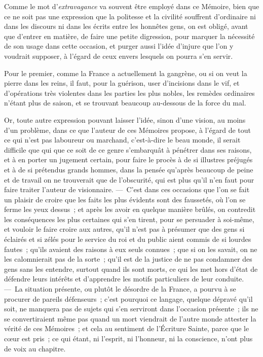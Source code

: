 \documentclass[french,twoside]{book} %
\begin{document}
Comme le mot d’{\itshape extravagance} va souvent être employé dans ce Mémoire, bien que ce ne soit pas une expression que la politesse et la civilité souffrent d’ordinaire ni dans les discours ni dans les écrits entre les honnêtes gens, on est obligé, avant que d’entrer en matière, de faire une petite digression, pour marquer la nécessité de son usage dans cette occasion, et purger aussi l’idée d’injure que l’on y voudrait supposer, à l’égard de ceux envers lesquels on pourra s’en servir.\par
Pour le premier, comme la France a actuellement la gangrène, ou si on veut la pierre dans les reins, il faut, pour la guérison, user d’incisions dans le vif, et d’opérations très violentes dans les parties les plus nobles, les remèdes ordinaires n’étant plus de saison, et se trouvant beaucoup au-dessous de la force du mal.\par
Or, toute autre expression pouvant laisser l’idée, sinon d’une vision, au moins d’un problème, dans ce que l’auteur de ces Mémoires propose, à l’égard de tout ce qui n’est pas laboureur ou marchand, c’est-à-dire le beau monde, il serait difficile que qui que ce soit de ce genre s’embarquât à pénétrer dans ses raisons, et à en porter un jugement certain, pour faire le procès à de si illustres préjugés et à de si prétendus grands hommes, dans la pensée qu’après beaucoup de peine et de travail on ne trouverait que de l’obscurité, qui est plus qu’il n’en faut pour faire traiter l’auteur de visionnaire. — C’est dans ces occasions que l’on se fait un plaisir de croire que les faits les plus évidents sont des faussetés, où l’on se ferme les yeux dessus ; et après les avoir en quelque manière brûlés, on contredit les conséquences les plus certaines qui s’en tirent, pour se persuader à soi-même, et vouloir le faire croire aux autres, qu’il n’est pas à présumer que des gens si éclairés et si zélés pour le service du roi et du public aient commis de si lourdes fautes ; qu’ils avaient des raisons à eux seuls connues ; que si on les savait, on ne les calomnierait pas de la sorte ; qu’il est de la justice de ne pas condamner des gens sans les entendre, surtout quand ils sont morts, ce qui les met hors d’état de défendre leurs intérêts et d’apprendre les motifs particuliers de leur conduite. — La situation présente, ou plutôt le désordre de la France, a pourvu à se procurer de pareils défenseurs ; c’est pourquoi ce langage, quelque dépravé qu’il soit, ne manquera pas de sujets qui s’en serviront dans l’occasion présente ; ils ne se convertiraient même pas quand un mort viendrait de l’autre monde attester la vérité de ces Mémoires ; et cela au sentiment de l’Écriture Sainte, parce que le cœur est pris ; ce qui étant, ni l’esprit, ni l’honneur, ni la conscience, n’ont plus de voix au chapitre.\par
\end{document}
